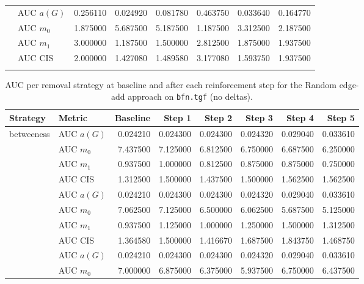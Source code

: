 \begin{table}[htbp]
\begin{tabular}{llrrrrrr}
    \addlinespace
    \multirow{4}{*}{random} & AUC $a(G)$ & 0.256110 & 0.024920 & 0.081780 & 0.463750 & 0.033640 & 0.164770 \\
    & AUC $m_0$ & 1.875000 & 5.687500 & 5.187500 & 1.187500 & 3.312500 & 2.187500 \\
    & AUC $m_1$ & 3.000000 & 1.187500 & 1.500000 & 2.812500 & 1.875000 & 1.937500 \\
    & AUC CIS & 2.000000 & 1.427080 & 1.489580 & 3.177080 & 1.593750 & 1.937500 \\
    \addlinespace
    \bottomrule
  \end{tabular}
\end{table}

\begin{table}[htbp]
  \centering
  \caption{AUC per removal strategy at baseline and after each reinforcement step for the Random edge-add approach on \texttt{bfn.tgf} (no deltas).}
  \label{tab:bfn-random_add-auc}
  \begin{tabular}{llrrrrrr}
    \toprule
    \textbf{Strategy} & \textbf{Metric} & \textbf{Baseline} & \textbf{Step 1} & \textbf{Step 2} & \textbf{Step 3} & \textbf{Step 4} & \textbf{Step 5} \\
    \midrule
    \multirow{4}{*}{betweeness} & AUC $a(G)$ & 0.024210 & 0.024300 & 0.024300 & 0.024320 & 0.029040 & 0.033610 \\
    & AUC $m_0$ & 7.437500 & 7.125000 & 6.812500 & 6.750000 & 6.687500 & 6.250000 \\
    & AUC $m_1$ & 0.937500 & 1.000000 & 0.812500 & 0.875000 & 0.875000 & 0.750000 \\
    & AUC CIS & 1.312500 & 1.500000 & 1.437500 & 1.500000 & 1.562500 & 1.562500 \\
    \addlinespace
    \multirow{4}{*}{closeness} & AUC $a(G)$ & 0.024210 & 0.024300 & 0.024300 & 0.024320 & 0.029040 & 0.033610 \\
    & AUC $m_0$ & 7.062500 & 7.125000 & 6.500000 & 6.062500 & 5.687500 & 5.125000 \\
    & AUC $m_1$ & 0.937500 & 1.125000 & 1.000000 & 1.250000 & 1.500000 & 1.312500 \\
    & AUC CIS & 1.364580 & 1.500000 & 1.416670 & 1.687500 & 1.843750 & 1.468750 \\
    \addlinespace
    \multirow{4}{*}{core influence} & AUC $a(G)$ & 0.024210 & 0.024300 & 0.024300 & 0.024320 & 0.029040 & 0.033610 \\
    & AUC $m_0$ & 7.000000 & 6.875000 & 6.375000 & 5.937500 & 6.750000 & 6.437500 \\

\end{tabular}
\end{table}

